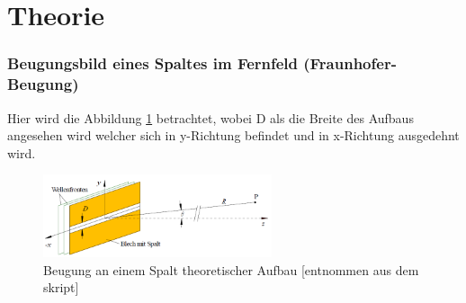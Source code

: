 \documentclass[../protokoll.tex]{subfiles}
\begin{document}
\part{Theorie}
\section{Beugungsbild eines Spaltes im Fernfeld (Fraunhofer-Beugung)}
Hier wird die Abbildung \ref{Theorie 1} betrachtet, wobei D als die Breite des Aufbaus angesehen wird welcher sich in y-Richtung befindet und in x-Richtung ausgedehnt wird. 
\begin{figure}[H]
    \centering
    \includegraphics[width=0.6\textwidth]{2023-05-15 - V5 - FRAUNHOFER- und FRESNEL-Beugung, Interferenz/images/Theorie/Blech mit Spalt.png}
    \caption{Beugung an einem Spalt theoretischer Aufbau [entnommen aus dem skript]}
    \label{Theorie 1}
\end{figure}
\end{document}
